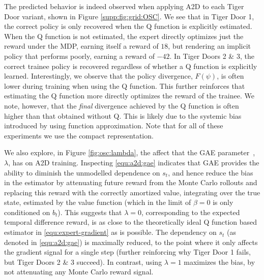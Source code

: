 The predicted behavior is indeed observed when applying A2D to each Tiger Door variant, shown in Figure \ref{supp:fig:grid:OSC}.  We see that in Tiger Door 1, the correct policy is only recovered when the Q function is explicitly estimated.  When the Q function is not estimated, the expert directly optimizes just the reward under the MDP, earning itself a reward of $18$, but rendering an implicit policy that performs poorly, earning a reward of $-42$.  In Tiger Doors 2 \& 3, the correct trainee policy is recovered regardless of whether a Q function is explicitly learned.  Interestingly, we observe that the policy divergence, $F(\psi)$, is often lower during training when using the Q function.  This further reinforces that estimating the Q function more directly optimizes the reward of the trainee.  We note, however, that the \emph{final} divergence achieved by the Q function is often higher than that obtained without Q. This is likely due to the systemic bias introduced by using function approximation.  Note that for all of these experiments we use the compact representation.  



We also explore, in Figure \ref{fig:osc:lambda}, the affect that the GAE parameter~\citep{schulman2015high}, $\lambda$, has on A2D training.  Inspecting \eqref{equ:a2d:gae} indicates that GAE provides the ability to diminish the unmodelled dependence on $s_t$, and hence reduce the bias in the estimator by attenuating future reward from the Monte Carlo rollouts and replacing this reward with the correctly amortized value, integrating over the true state, estimated by the value function (which in the limit of $\beta = 0$ is only conditioned on $b_t$).   This suggests that $\lambda=0$, corresponding to the expected temporal difference reward, is as close to the theoretically ideal Q function based estimator in \eqref{equ:expert-gradient} as is possible.  The dependency on $s_t$ (as denoted in \eqref{equ:a2d:gae}) is maximally reduced, to the point where it only affects the gradient signal for a single step (further reinforcing why Tiger Door 1 fails, but Tiger Doors 2 \& 3 succeed).  In contrast, using $\lambda = 1$ maximizes the bias, by not attenuating any Monte Carlo reward signal. 


